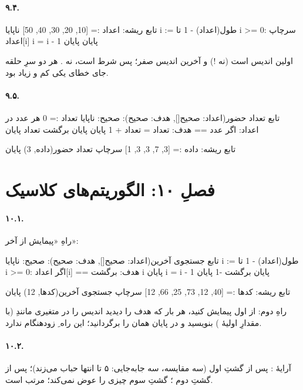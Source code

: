 \paragraph{۹.۴.}
\begin{salamfa}
تابع ریشه:
    اعداد := [10, 20, 30, 40, 50]
    ناپایا i := طول(اعداد) - 1
    تا i >= 0:
        سرچاپ اعداد[i]
        i = i - 1
    پایان
پایان
\end{salamfa}
اولین اندیس  است (نه !) و آخرین اندیس صفر؛ پس
شرط  است، نه . هر دو سرِ حلقه جای خطای یکی کم
و زیاد بود.

\paragraph{۹.۵.}
\begin{salamfa}
تابع تعداد حضور(اعداد: صحیح[], هدف: صحیح): صحیح:
    ناپایا تعداد := 0
    هر عدد در اعداد:
        اگر عدد == هدف:
            تعداد = تعداد + 1
        پایان
    پایان
    برگشت تعداد
پایان

تابع ریشه:
    داده := [3, 7, 3, 3, 1]
    سرچاپ تعداد حضور(داده, 3)
پایان
\end{salamfa}

\section*{فصلِ ۱۰: الگوریتم‌های کلاسیک}

\paragraph{۱۰.۱.} راهِ «پیمایش از آخر»:
\begin{salamfa}
تابع جستجوی آخرین(اعداد: صحیح[], هدف: صحیح): صحیح:
    ناپایا i := طول(اعداد) - 1
    تا i >= 0:
        اگر اعداد[i] == هدف:
            برگشت i
        پایان
        i = i - 1
    پایان
    برگشت -1
پایان

تابع ریشه:
    کدها := [40, 12, 73, 25, 66, 12]
    سرچاپ جستجوی آخرین(کدها, 12)
پایان
\end{salamfa}
راهِ دوم: از اول پیمایش کنید، هر بار که هدف را دیدید اندیس را در متغیری
مانندِ  (با مقدارِ اولیهٔ ) بنویسید و در
پایان همان را برگردانید؛ این راه ِ زودهنگام ندارد.

\paragraph{۱۰.۲.} آرایهٔ \code{[5, 1, 4, 2]}: پس از گشتِ اول
\code{[1, 4, 2, 5]} (سه مقایسه، سه جابه‌جایی: ۵ تا انتها حباب می‌زند)؛
پس از گشتِ دوم \code{[1, 2, 4, 5]}؛ گشتِ سوم چیزی را عوض نمی‌کند؛ مرتب
است.

